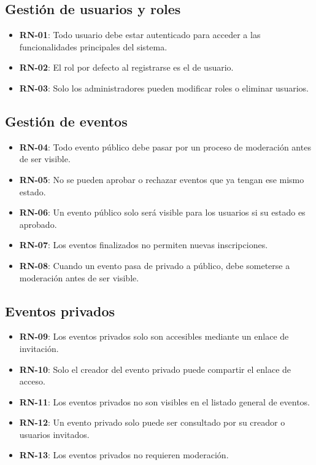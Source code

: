 \subsection{Gestión de usuarios y roles}

\begin{itemize}
    \item \textbf{RN-01}: Todo usuario debe estar autenticado para acceder a las funcionalidades principales del sistema.
    \item \textbf{RN-02}: El rol por defecto al registrarse es el de usuario.
    \item \textbf{RN-03}: Solo los administradores pueden modificar roles o eliminar usuarios.
\end{itemize}

\subsection{Gestión de eventos}

\begin{itemize}
    \item \textbf{RN-04}: Todo evento público debe pasar por un proceso de moderación antes de ser visible.
    \item \textbf{RN-05}: No se pueden aprobar o rechazar eventos que ya tengan ese mismo estado.
    \item \textbf{RN-06}: Un evento público solo será visible para los usuarios si su estado es aprobado.
    \item \textbf{RN-07}: Los eventos finalizados no permiten nuevas inscripciones.
    \item \textbf{RN-08}: Cuando un evento pasa de privado a público, debe someterse a moderación antes de ser visible.
\end{itemize}

\subsection{Eventos privados}

\begin{itemize}
    \item \textbf{RN-09}: Los eventos privados solo son accesibles mediante un enlace de invitación.
    \item \textbf{RN-10}: Solo el creador del evento privado puede compartir el enlace de acceso.
    \item \textbf{RN-11}: Los eventos privados no son visibles en el listado general de eventos.
    \item \textbf{RN-12}: Un evento privado solo puede ser consultado por su creador o usuarios invitados.
    \item \textbf{RN-13}: Los eventos privados no requieren moderación.

\end{itemize}

